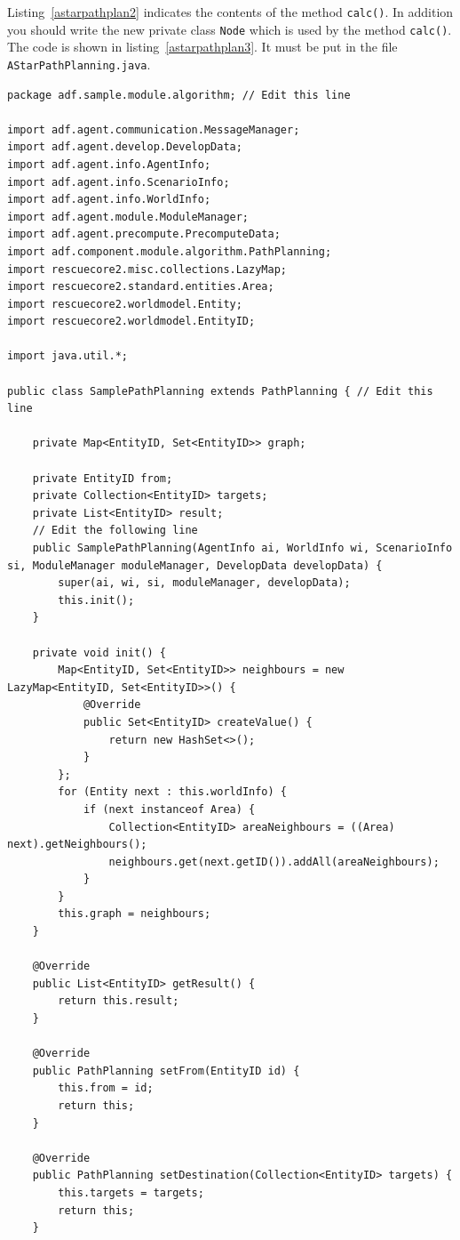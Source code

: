 \documentclass[a4paper]{article}
\begin{document}
Listing~\ref{astarpathplan2} indicates the contents of the method
\texttt{calc()}. In addition you should write the new private class \texttt{Node} which is used by the method \texttt{calc()}. The code is shown in listing~\ref{astarpathplan3}. It must be put in the file \texttt{AStarPathPlanning.java}.
\begin{lstlisting}[caption=SamplePathPlanning.java,label=samplepathplan]
package adf.sample.module.algorithm; // Edit this line

import adf.agent.communication.MessageManager;
import adf.agent.develop.DevelopData;
import adf.agent.info.AgentInfo;
import adf.agent.info.ScenarioInfo;
import adf.agent.info.WorldInfo;
import adf.agent.module.ModuleManager;
import adf.agent.precompute.PrecomputeData;
import adf.component.module.algorithm.PathPlanning;
import rescuecore2.misc.collections.LazyMap;
import rescuecore2.standard.entities.Area;
import rescuecore2.worldmodel.Entity;
import rescuecore2.worldmodel.EntityID;

import java.util.*;

public class SamplePathPlanning extends PathPlanning { // Edit this line

    private Map<EntityID, Set<EntityID>> graph;

    private EntityID from;
    private Collection<EntityID> targets;
    private List<EntityID> result;
    // Edit the following line
    public SamplePathPlanning(AgentInfo ai, WorldInfo wi, ScenarioInfo si, ModuleManager moduleManager, DevelopData developData) {
        super(ai, wi, si, moduleManager, developData);
        this.init();
    }

    private void init() {
        Map<EntityID, Set<EntityID>> neighbours = new LazyMap<EntityID, Set<EntityID>>() {
            @Override
            public Set<EntityID> createValue() {
                return new HashSet<>();
            }
        };
        for (Entity next : this.worldInfo) {
            if (next instanceof Area) {
                Collection<EntityID> areaNeighbours = ((Area) next).getNeighbours();
                neighbours.get(next.getID()).addAll(areaNeighbours);
            }
        }
        this.graph = neighbours;
    }

    @Override
    public List<EntityID> getResult() {
        return this.result;
    }

    @Override
    public PathPlanning setFrom(EntityID id) {
        this.from = id;
        return this;
    }

    @Override
    public PathPlanning setDestination(Collection<EntityID> targets) {
        this.targets = targets;
        return this;
    }


\end{lstlisting}
\end{document}
